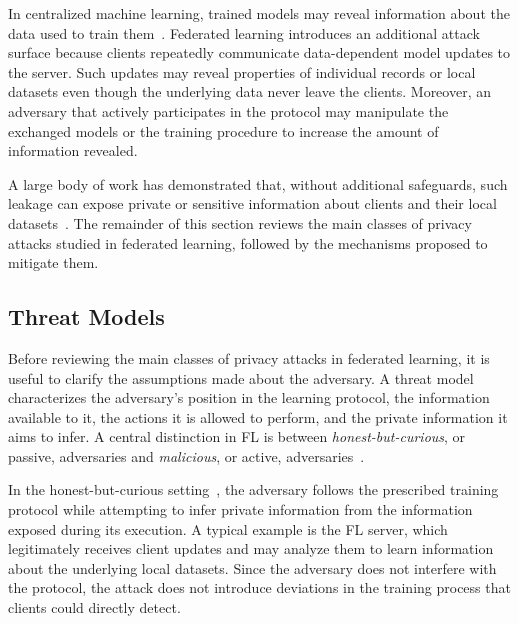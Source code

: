 In centralized machine learning, trained models may reveal information about the data used to train them~\cite{shokri_mia, aia_fredrikson, carlini_extract_data, feng2024privacy}. Federated learning introduces an additional attack surface because clients repeatedly communicate data-dependent model updates to the server. Such updates may reveal properties of individual records or local datasets even though the underlying data never leave the clients. Moreover, an adversary that actively participates in the protocol may manipulate the exchanged models or the training procedure to increase the amount of information revealed.

A large body of work has demonstrated that, without additional safeguards, such leakage can expose private or sensitive information about clients and their local datasets~\cite{lyu2020threatsfederatedlearningsurvey, zhao_fl_attacks_review}. The remainder of this section reviews the main classes of privacy attacks studied in federated learning, followed by the mechanisms proposed to mitigate them.

\subsection{Threat Models}\label{subsec:threatmodel}

Before reviewing the main classes of privacy attacks in federated learning, it is useful to clarify the assumptions made about the adversary. A threat model characterizes the adversary's position in the learning protocol, the information available to it, the actions it is allowed to perform, and the private information it aims to infer. A central distinction in FL is between \textit{honest-but-curious}, or passive, adversaries and \textit{malicious}, or active, adversaries~\cite{Nasr2018ComprehensivePA}.

In the honest-but-curious setting~\cite{honest_but_curious}, the adversary follows the prescribed training protocol while attempting to infer private information from the information exposed during its execution. A typical example is the FL server, which legitimately receives client updates and may analyze them to learn information about the underlying local datasets. Since the adversary does not interfere with the protocol, the attack does not introduce deviations in the training process that clients could directly detect.

